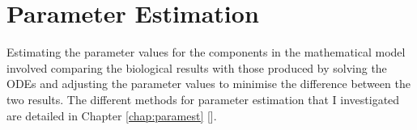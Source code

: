 \section{Parameter Estimation}
Estimating the parameter values for the components in the mathematical model involved comparing the biological results with those produced by solving the ODEs and adjusting the parameter values to minimise the difference between the two results. The different methods for parameter estimation that I investigated are detailed in Chapter \ref{chap:paramest} [].